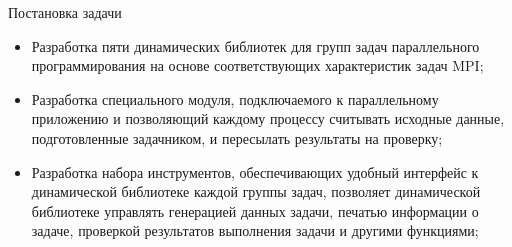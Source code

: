 \begin{frame}{Постановка задачи}

\begin{itemize}
    \item Разработка пяти динамических библиотек для групп задач параллельного программирования на основе соответствующих характеристик задач MPI;
    \item Разработка специального модуля, подключаемого к параллельному приложению и позволяющий каждому процессу считывать исходные данные, подготовленные задачником, и пересылать результаты на проверку;
    \item Разработка набора инструментов, обеспечивающих удобный интерфейс к динамической библиотеке каждой группы задач, позволяет динамической библиотеке управлять генерацией данных задачи, печатью информации о задаче, проверкой результатов выполнения задачи и другими функциями;

\end{itemize}
    
\end{frame}